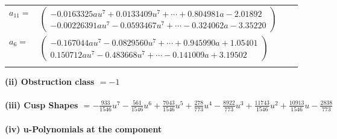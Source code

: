 \documentclass[1p]{elsarticle_modified}
\theoremstyle{definition}
\begin{document}
\begin{tabular}{m{7pt} m{180pt} m{7pt} m{180pt} }
\flushright $a_{11}=$&$\begin{pmatrix}-0.0163325 a u^{7}+0.0133409 u^{7}+\cdots+0.804981 a-2.01892\\-0.00226391 a u^{7}-0.0593467 u^{7}+\cdots-0.324062 a-3.35220\end{pmatrix}$ \\
\flushright $a_{6}=$&$\begin{pmatrix}-0.167044 a u^{7}-0.0829560 u^{7}+\cdots+0.945990 a+1.05401\\0.150712 a u^{7}-0.483668 u^{7}+\cdots-0.141009 a+3.19502\end{pmatrix}$\\&\end{tabular}
\flushleft \textbf{(ii) Obstruction class $= -1$}\\~\\
\flushleft \textbf{(iii) Cusp Shapes $= -\frac{933}{1546} u^7-\frac{561}{1546} u^6+\frac{7043}{1546} u^5+\frac{278}{773} u^4-\frac{8922}{773} u^3+\frac{11743}{1546} u^2+\frac{10913}{1546} u-\frac{2838}{773}$}\\~\\
\newpage\renewcommand{\arraystretch}{1}
\flushleft \textbf{(iv) u-Polynomials at the component}\newline \\
\end{document}
